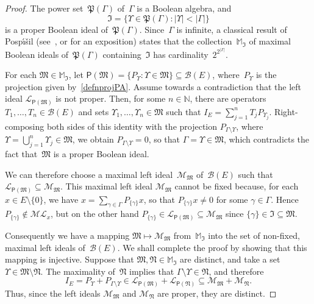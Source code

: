 \documentclass[12pt]{amsart}
\theoremstyle{definition}
\numberwithin{equation}{section}
\begin{document}
\begin{proof}
  The power set~$\mathfrak{P}(\Gamma)$ of~$\Gamma$ is a Boolean
  algebra, and $$\mathfrak{I} = \bigl\{\Upsilon\in\mathfrak{P}(\Gamma) :
  |\Upsilon|<|\Gamma|\bigr\}$$ is a proper Boolean ideal
  of~$\mathfrak{P}(\Gamma)$.  Since~$\Gamma$ is infinite, a classical
  result of Posp\'{\i}\v{s}il (see~\cite{Pospisil}, or \cite[Corollary
  7.4]{cn} for an exposition) states that the
  collection~$\mathbb{M}_{\mathfrak{I}}$ of maximal Boolean ideals
  of~$\mathfrak{P}(\Gamma)$ containing~$\mathfrak{I}$ has
  cardinality~$2^{2^{|\Gamma|}}$.

  For each $\mathfrak{M}\in\mathbb{M}_{\mathfrak{I}}$, let
  $\mathsf{P}(\mathfrak{M}) = \{ P_\Upsilon :
  \Upsilon\in\mathfrak{M}\}\subseteq\mathscr{B}(E)$,
  where~$P_\Upsilon$ is the projection given
  by~\eqref{defnprojPA}. Assume towards a contradiction that the left
  ideal $\mathscr{L}_{\mathsf{P}(\mathfrak{M})}$ is not proper. Then,
  for some $n\in{\ensuremath{\mathbb{N}}}$, there are operators $T_1,\ldots,T_n\in
  \mathscr{B}(E)$ and sets $\Upsilon_1,\ldots,\Upsilon_n\in
  \mathfrak{M}$ such that $I_E = \sum_{j=1}^n T_j P_{\Upsilon_j}$.
  Right-composing both sides of this identity with the projection
  $P_{\Gamma\setminus \Upsilon}$, where $\Upsilon=\bigcup_{j=1}^n
  \Upsilon_j\in\mathfrak{M}$, we obtain $P_{\Gamma\setminus \Upsilon}
  = 0$, so that $\Gamma = \Upsilon\in\mathfrak{M}$, which contradicts
  the fact that~$\mathfrak{M}$ is a proper Boolean ideal.

  We can therefore choose a maximal left
  ideal~$\mathscr{M}_{\mathfrak{M}}$ of~$\mathscr{B}(E)$ such that
  $\mathscr{L}_{\mathsf{P}(\mathfrak{M})}\subseteq
  \mathscr{M}_{\mathfrak{M}}$.  This maximal left ideal
  $\mathscr{M}_{\mathfrak{M}}$ cannot be fixed because, for each $x\in
  E\setminus\{0\}$, we have $x =
  \sum_{\gamma\in\Gamma}P_{\{\gamma\}}x$, so that $P_{\{\gamma\}}x\neq
  0$ for some $\gamma\in\Gamma$. Hence $P_{\{\gamma\}}\notin
  \mathscr{M}\!\mathscr{L}_x$, but on the other hand
  $P_{\{\gamma\}}\in\mathscr{L}_{\mathsf{P}(\mathfrak{M})}\subseteq
  \mathscr{M}_{\mathfrak{M}}$ since
  $\{\gamma\}\in\mathfrak{I}\subseteq\mathfrak{M}$.

  Consequently we have a mapping $\mathfrak{M}\mapsto
  \mathscr{M}_{\mathfrak{M}}$ from~$\mathbb{M}_{\mathfrak{I}}$ into
  the set of non-fixed, maximal left ideals of~$\mathscr{B}(E)$.  We
  shall complete the proof by showing that this mapping is
  injective. Suppose that
  $\mathfrak{M},\mathfrak{N}\in\mathbb{M}_{\mathfrak{I}}$ are
  distinct, and take a set
  $\Upsilon\in\mathfrak{M}\setminus\mathfrak{N}$.  The maximality
  of~$\mathfrak{N}$ implies that $\Gamma\setminus
  \Upsilon\in\mathfrak{N}$, and therefore \[ I_E = P_\Upsilon +
  P_{\Gamma\setminus
    \Upsilon}\in\mathscr{L}_{\mathsf{P}(\mathfrak{M})} +
  \mathscr{L}_{\mathsf{P}(\mathfrak{N})}\subseteq
  \mathscr{M}_\mathfrak{M} + \mathscr{M}_\mathfrak{N}. \] Thus, since
  the left ideals $\mathscr{M}_\mathfrak{M}$ and
  $\mathscr{M}_\mathfrak{N}$ are proper, they are distinct.
\end{proof}
\end{document}
